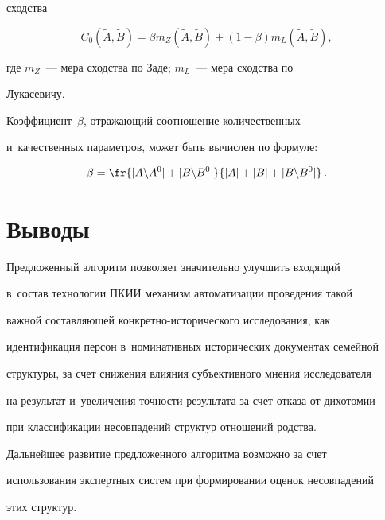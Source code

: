 сходства


  $$


  C_0\left( \tilde{A},\tilde{B}\right) =\beta m_Z\left(\tilde{A},\tilde{B}\right) 


+(1-\beta) m_L \left( \tilde{A},\tilde{B}\right),


  $$


где $m_Z$~--- мера сходства по Заде;  $m_L$~--- мера сходства по 


Лукасевичу.


  


  Коэффициент~$\beta$, отражающий соотношение количественных 


и~качественных параметров, может быть вычислен по формуле:


  $$


  \beta= \fr{\vert A\backslash A^0 \vert +\vert B\backslash B^0 \vert} {\vert 


A\vert+ \vert B\vert +\vert B\backslash B^0\vert}\,.


  $$





\section{Выводы}





  Предложенный алгоритм позволяет значительно улучшить входящий 


в~состав технологии ПКИИ механизм автоматизации проведения такой 


важной составляющей кон\-крет\-но-ис\-то\-ри\-че\-ско\-го исследования, как 


идентификация персон в~номинативных исторических документах семейной 


структуры, за счет снижения влияния субъективного мнения исследователя 


на результат и~увеличения точности результата за счет отказа от дихотомии 


при классификации несовпадений структур отношений родства.


  


  Дальнейшее развитие предложенного алгоритма возможно за счет 


использования экспертных систем при формировании оценок несовпадений 


этих структур. 


